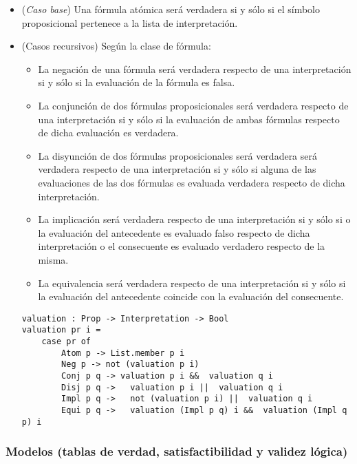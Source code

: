\documentclass[a4paper]{report}
\begin{document}
\begin{itemize}
\item (\textit{Caso base}) Una fórmula atómica será verdadera si y sólo si el símbolo proposicional pertenece a la lista de interpretación.

\item (Casos recursivos) Según la clase de fórmula:
\begin{itemize}
\item La negación de una fórmula será verdadera respecto de una interpretación si y sólo si la evaluación de la fórmula es falsa.
\item La conjunción de dos fórmulas proposicionales será verdadera respecto de una interpretación si y sólo si la evaluación de ambas fórmulas respecto de dicha evaluación es verdadera.
\item La disyunción de dos fórmulas proposicionales será verdadera será verdadera respecto de una interpretación si y sólo si alguna de las evaluaciones de las dos fórmulas es evaluada verdadera respecto de dicha interpretación.
\item La implicación será verdadera respecto de una interpretación si y sólo si o la evaluación del antecedente es evaluado falso respecto de dicha interpretación o el consecuente es evaluado verdadero respecto de la misma.
\item La equivalencia será verdadera respecto de una interpretación si y sólo si la evaluación del antecedente coincide con la evaluación del consecuente.\\
\end{itemize} 

\newpage
\begin{lstlisting}[caption= Función de evaluación de las fórmulas proposicionales]
valuation : Prop -> Interpretation -> Bool
valuation pr i =
    case pr of
        Atom p -> List.member p i
        Neg p -> not (valuation p i)
        Conj p q -> valuation p i &&  valuation q i
        Disj p q ->   valuation p i ||  valuation q i
        Impl p q ->   not (valuation p i) ||  valuation q i
        Equi p q ->   valuation (Impl p q) i &&  valuation (Impl q p) i
\end{lstlisting}
\end{itemize}

\subsubsection{Modelos (tablas de verdad, satisfactibilidad y validez lógica)}
\end{document}

